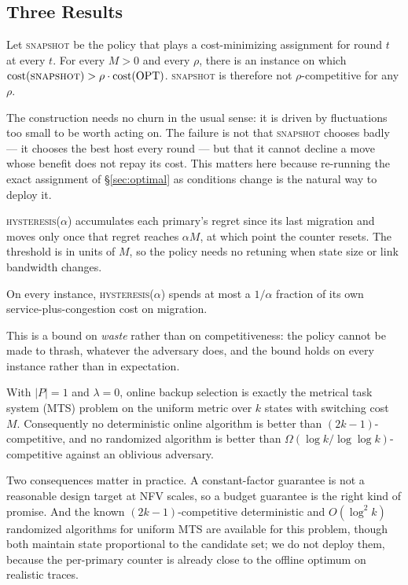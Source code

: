 \subsection{Three Results}

\begin{theorem}
\label{thm:snapshot}
Let \textsc{snapshot} be the policy that plays a cost-minimizing assignment for
round $t$ at every $t$. For every $M > 0$ and every $\rho$, there is an instance on
which $\mathrm{cost}(\textsc{snapshot}) > \rho \cdot \mathrm{cost}(\mathrm{OPT})$.
\textsc{snapshot} is therefore not $\rho$-competitive for any $\rho$.
\end{theorem}

\noindent
The construction needs no churn in the usual sense: it is driven by fluctuations
too small to be worth acting on. The failure is not that \textsc{snapshot}
chooses badly --- it chooses the best host every round --- but that it cannot
decline a move whose benefit does not repay its cost. This matters here because
re-running the exact assignment of \S\ref{sec:optimal} as conditions change is
the natural way to deploy it.

\textsc{hysteresis}($\alpha$) accumulates each primary's regret since its last
migration and moves only once that regret reaches $\alpha M$, at which point the
counter resets. The threshold is in units of $M$, so the policy needs no
retuning when state size or link bandwidth changes.

\begin{proposition}
\label{prop:budget}
On every instance, \textsc{hysteresis}($\alpha$) spends at most a $1/\alpha$
fraction of its own service-plus-congestion cost on migration.
\end{proposition}

\noindent
This is a bound on \emph{waste} rather than on competitiveness: the policy
cannot be made to thrash, whatever the adversary does, and the bound holds on
every instance rather than in expectation.

\begin{proposition}
\label{prop:lower}
With $|P| = 1$ and $\lambda = 0$, online backup selection is exactly the metrical
task system (MTS) problem on the uniform metric over $k$ states with switching cost
$M$. Consequently no deterministic online algorithm is better than
$(2k-1)$-competitive, and no randomized algorithm is better than
$\Omega(\log k / \log\log k)$-competitive against an oblivious adversary.
\end{proposition}

\noindent
Two consequences matter in practice. A constant-factor guarantee is not a
reasonable design target at NFV scales, so a budget guarantee is the right kind
of promise. And the known $(2k-1)$-competitive deterministic and
$O(\log^2 k)$ randomized algorithms for uniform MTS are available for this
problem, though both maintain state proportional to the candidate set; we do not
deploy them, because the per-primary counter is already close to the offline
optimum on realistic traces.

